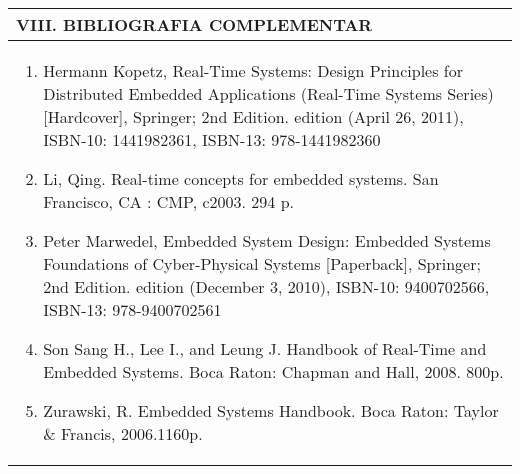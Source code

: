 \documentclass[12pt]{article}
\begin{document}

\begin{longtable}{|L{1.025\textwidth}|} \hline
%
{\bf VIII. BIBLIOGRAFIA COMPLEMENTAR} \\ \hline
\begin{enumerate}
\item Hermann Kopetz, Real-Time Systems: Design Principles for Distributed Embedded Applications (Real-Time Systems Series) [Hardcover], Springer; 2nd Edition. edition (April 26, 2011), ISBN-10: 1441982361, ISBN-13: 978-1441982360 
\item Li, Qing. Real-time concepts for embedded systems. San Francisco, CA : CMP, c2003. 294 p. 
\item Peter Marwedel, Embedded System Design: Embedded Systems Foundations of Cyber-Physical Systems [Paperback], Springer; 2nd Edition. edition (December 3, 2010), ISBN-10: 9400702566, ISBN-13: 978-9400702561 
\item Son Sang H., Lee I., and Leung J. Handbook of Real-Time and Embedded Systems. Boca Raton: Chapman and Hall, 2008. 800p. 
\item Zurawski, R. Embedded Systems Handbook. Boca Raton: Taylor \& Francis, 2006.1160p.
\end{enumerate}
 \\ \hline
\end{longtable}



\end{document}
